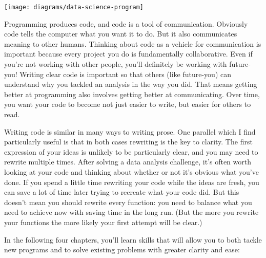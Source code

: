 \documentclass[]{book}
\begin{document}
\begin{center}\texttt{[image: diagrams/data-science-program]} \end{center}

Programming produces code, and code is a tool of communication.
Obviously code tells the computer what you want it to do. But it also
communicates meaning to other humans. Thinking about code as a vehicle
for communication is important because every project you do is
fundamentally collaborative. Even if you're not working with other
people, you'll definitely be working with future-you! Writing clear code
is important so that others (like future-you) can understand why you
tackled an analysis in the way you did. That means getting better at
programming also involves getting better at communicating. Over time,
you want your code to become not just easier to write, but easier for
others to read.

Writing code is similar in many ways to writing prose. One parallel
which I find particularly useful is that in both cases rewriting is the
key to clarity. The first expression of your ideas is unlikely to be
particularly clear, and you may need to rewrite multiple times. After
solving a data analysis challenge, it's often worth looking at your code
and thinking about whether or not it's obvious what you've done. If you
spend a little time rewriting your code while the ideas are fresh, you
can save a lot of time later trying to recreate what your code did. But
this doesn't mean you should rewrite every function: you need to balance
what you need to achieve now with saving time in the long run. (But the
more you rewrite your functions the more likely your first attempt will
be clear.)

In the following four chapters, you'll learn skills that will allow you
to both tackle new programs and to solve existing problems with greater
clarity and ease:
\end{document}
